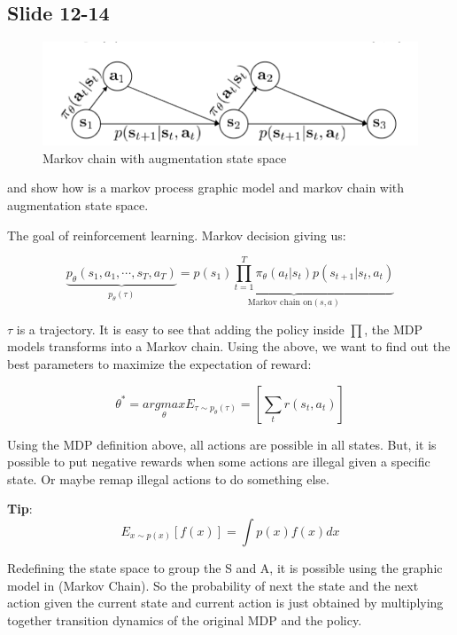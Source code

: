 \documentclass[]{article}
\begin{document}
\subsection{Slide 12-14}%
\label{sub:Slide 12}

\begin{figure}
\begin{center}
    \includegraphics[scale=0.5]{cap3img/markovchaincomp.png}
\end{center}
\caption{Markov chain with augmentation state space}
\label{fig:markovprocesscomp}
\end{figure}

 and  show how is a markov process graphic model and
markov chain with augmentation state space.

The goal of reinforcement learning. Markov decision giving us:

$$\underbrace{p_{\theta}(s_{1},a_{1},\cdots, s_{T},a_{T})}_{p_\theta(\tau)} = \underbrace{p(s_{1}) \prod_{t=1}^{T}\pi_{\theta}(a_{t}|s_{t})p(s_{t +
    1}|s_{t},a_{t})}_{\text{Markov chain on}  (s,a)}$$

$\tau$ is a trajectory. It is easy to see that adding the policy inside $\prod$, the MDP models transforms into a Markov
chain. Using the above, we want to find out the best parameters to maximize the expectation of reward:

$$\theta^{*} = \underset{\theta}{argmax}\mathit{E}_{\tau \sim p_{\theta}(\tau)} = \left[ \sum_{t} r(s_{t},a_{t})
\right]$$

\par Using the MDP definition above, all actions are possible in all states. But, it is possible to put negative rewards
when some actions are illegal given a specific state. Or maybe remap illegal actions to do something else.

\textbf{Tip}: 
$$ E_{x\sim p(x)}[f(x)] = \int p(x)f(x)dx $$

\par Redefining the state space to group the S and A, it is possible using the graphic model in
(Markov Chain). So the probability of next the state and the next action given the current
state and current action is just obtained by multiplying together  transition dynamics of the original MDP and the
policy.
\end{document}
